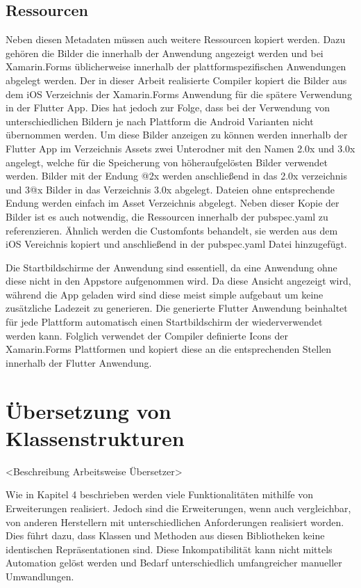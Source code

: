 \subsection{Ressourcen}
Neben diesen Metadaten müssen auch weitere Ressourcen kopiert werden.  Dazu gehören die Bilder die innerhalb der Anwendung angezeigt werden und bei Xamarin.Forms üblicherweise innerhalb der plattformspezifischen Anwendungen abgelegt werden.  Der in dieser Arbeit realisierte Compiler kopiert die Bilder aus dem iOS Verzeichnis der Xamarin.Forms Anwendung für die spätere Verwendung in der Flutter App.  Dies hat jedoch zur Folge, dass bei der Verwendung von unterschiedlichen Bildern je nach Plattform die Android Varianten nicht übernommen werden.  Um diese Bilder anzeigen zu können werden innerhalb der Flutter App im Verzeichnis Assets zwei Unterodner mit den Namen 2.0x und 3.0x angelegt, welche für die Speicherung von höheraufgelösten Bilder verwendet werden.  Bilder mit der Endung @2x werden anschließend in das 2.0x verzeichnis und 3@x Bilder in das Verzeichnis 3.0x abgelegt.  Dateien ohne entsprechende Endung werden einfach im Asset Verzeichnis abgelegt.  Neben dieser Kopie der Bilder ist es auch notwendig,  die Ressourcen innerhalb der pubspec.yaml zu referenzieren. Ähnlich werden die Customfonts behandelt,  sie werden aus dem iOS Vereichnis kopiert und anschließend in der pubspec.yaml Datei hinzugefügt.  


Die Startbildschirme der Anwendung sind essentiell,  da eine Anwendung ohne diese nicht in den Appstore aufgenommen wird.  Da diese Ansicht angezeigt wird,  während die App geladen wird sind diese meist simple aufgebaut um keine zusätzliche Ladezeit zu generieren.  Die generierte Flutter Anwendung beinhaltet für jede Plattform automatisch einen Startbildschirm der wiederverwendet werden kann.  Folglich verwendet der Compiler definierte Icons der Xamarin.Forms Plattformen und kopiert diese an die entsprechenden Stellen innerhalb der Flutter Anwendung.  



\section{Übersetzung von Klassenstrukturen}

<Beschreibung Arbeitsweise Übersetzer>

Wie in Kapitel 4 beschrieben werden viele Funktionalitäten mithilfe von Erweiterungen realisiert.  Jedoch sind die Erweiterungen, wenn auch vergleichbar, von anderen Herstellern mit unterschiedlichen Anforderungen realisiert worden.  Dies führt dazu,  dass Klassen und Methoden aus diesen Bibliotheken keine identischen Repräsentationen sind.  Diese Inkompatibilität kann nicht mittels Automation gelöst werden und Bedarf  unterschiedlich umfangreicher manueller Umwandlungen.  



